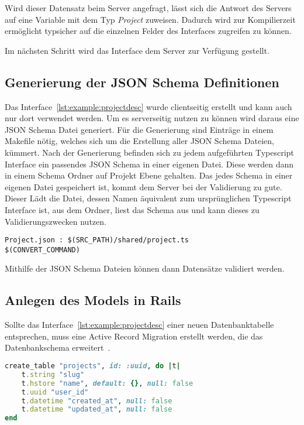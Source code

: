 Wird dieser Datensatz beim Server angefragt, lässt sich die Antwort des Servers auf eine Variable mit dem Typ \emph{Project} zuweisen.
Dadurch wird zur Kompilierzeit ermöglicht typsicher auf die einzelnen Felder des Interfaces zugreifen zu können.

Im nächsten Schritt wird das Interface dem Server zur Verfügung gestellt.

\subsection{Generierung der JSON Schema Definitionen}
\label{sec:requirements:example:schema}
Das Interface~\ref{lst:example:projectdesc} wurde clientseitig erstellt und kann auch nur dort verwendet werden. Um es serverseitig nutzen zu können wird daraus eine JSON Schema Datei generiert.
Für die Generierung sind Einträge in einem Makefile nötig, welches sich um die Erstellung aller JSON Schema Dateien, kümmert. Nach der Generierung befinden sich zu jedem aufgeführten Typescript Interface ein passendes JSON Schema in einer eigenen Datei. Diese werden dann in einem Schema Ordner auf Projekt Ebene gehalten. Das jedes Schema in einer eigenen Datei gespeichert ist, kommt dem Server bei der Validierung zu gute. 
Dieser Lädt die Datei, dessen Namen äquivalent zum ursprünglichen Typescript Interface ist, aus dem Ordner, liest das Schema aus und kann dieses zu Validierungszwecken nutzen.

\begin{lstlisting}[float=h!,caption={TypeScript Interface für die Project Darstellung in einer Liste}, label={lst:example:makefile}]
Project.json : $(SRC_PATH)/shared/project.ts
$(CONVERT_COMMAND)
\end{lstlisting}

Mithilfe der JSON Schema Dateien können dann Datensätze validiert werden.

\subsection{Anlegen des Models in Rails}
\label{sec:requirements:example:model}

Sollte das Interface~\ref{lst:example:projectdesc} einer neuen Datenbanktabelle entsprechen, muss eine Active Record Migration erstellt werden,
die das Datenbankschema erweitert~\cite{rails-migration}.

\begin{lstlisting}[language=Ruby,float=h!,caption={Rails Migration zum hinzufügen einer \emph{projects} Datenbanktabelle}, label={lst:example:migration}]
create_table "projects", id: :uuid, do |t|
	t.string "slug"
	t.hstore "name", default: {}, null: false
	t.uuid "user_id"
	t.datetime "created_at", null: false
	t.datetime "updated_at", null: false
end
\end{lstlisting}

